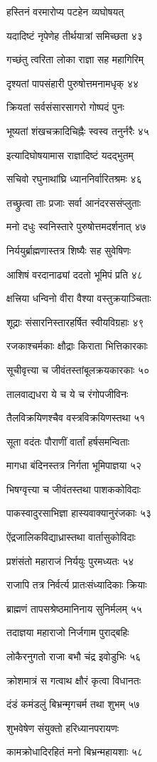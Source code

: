 हस्तिनं वरमारोप्य पटहेन व्यघोषयत्

यदादिष्टं नृपेणेह तीर्थयात्रां समिच्छता ४३

गच्छंतु त्वरिता लोका राज्ञा सह महागिरिम्

दृश्यतां पापसंहारी पुरुषोत्तमनामधृक् ४४

क्रियतां सर्वसंसारसागरो गोष्पदं पुनः

भूष्यतां शंखचक्रादिचिह्नैः स्वस्व तनुर्नरैः ४५

इत्यादिघोषयामास राज्ञादिष्टं यदद्भुतम्

सचिवो रघुनाथांघ्रि ध्याननिर्वारितश्रमः ४६

तच्छ्रुत्वा ताः प्रजाः सर्वा आनंदरससंप्लुताः

मनो दधुः स्वनिस्तारे पुरुषोत्तमदर्शनात् ४७

निर्ययुर्ब्राह्मणास्तत्र शिष्यैः सह सुवेषिणः

आशिषं वरदानाढ्यां ददतो भूमिपं प्रति ४८

क्षत्त्रिया धन्विनो वीरा वैश्या वस्तुक्रयाञ्चिताः

शूद्राः संसारनिस्तारहर्षित स्वीयविग्रहाः ४९

रजकाश्चर्मकाः क्षौद्राः किराता भित्तिकारकाः

सूचीवृत्त्या च जीवंतस्तांबूलक्रयकारकाः ५०

तालवाद्यधरा ये च ये च रंगोपजीविनः

तैलविक्रयिणश्चैव वस्त्रविक्रयिणस्तथा ५१

सूता वदंतः पौराणीं वार्तां हर्षसमन्विताः

मागधा बंदिनस्तत्र निर्गता भूमिपाज्ञया ५२

भिषग्वृत्त्या च जीवंतस्तथा पाशककोविदाः

पाकस्वादुरसाभिज्ञा हास्यवाक्यानुरंजकाः ५३

ऐंद्रजालिकविद्याध्रास्तथा वार्तासुकोविदाः

प्रशंसंतो महाराजं निर्ययुः पुरमध्यतः ५४

राजापि तत्र निर्वर्त्य प्रातःसंध्यादिकाः क्रियाः

ब्राह्मणं तापसश्रेष्ठमानिनाय सुनिर्मलम् ५५

तदाज्ञया महाराजो निर्जगाम पुराद्बहिः

लोकैरनुगतो राजा बभौ चंद्र इवोडुभिः ५६

क्रोशमात्रं स गत्वाथ क्षौरं कृत्वा विधानतः

दंडं कमंडलुं बिभ्रन्मृगचर्म तथा शुभम् ५७

शुभवेषेण संयुक्तो हरिध्यानपरायणः

कामक्रोधादिरहितं मनो बिभ्रन्महायशाः ५८

